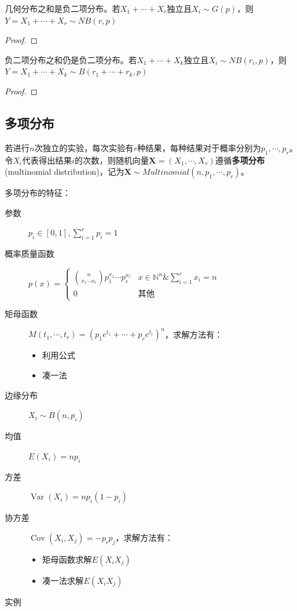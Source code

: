 \begin{proposition}\label{prop:sum_of_geo}
    几何分布之和是负二项分布。若$X_1+\cdots+X_r$独立且$X_i \sim G(p)$，则$Y=X_1+\cdots+X_r  \sim NB(r,p)$
\end{proposition}
\begin{proof}
\end{proof}

\begin{proposition}
    负二项分布之和仍是负二项分布。若$X_1+\cdots+X_k$独立且$X_i \sim NB(r_i,p)$，则$Y=X_1+\cdots+X_k  \sim B(r_1+\cdots+r_k,p )$
\end{proposition}

\begin{proof}
\end{proof}

\subsection{多项分布}

\begin{definition}[多项分布]
    若进行$n$次独立的实验，每次实验有$r$种结果，每种结果对于概率分别为$p_1,\cdots ,p_r$。令$X_i$代表得出结果$i$的次数，则随机向量$\mathbf{X}=(X_1,\cdots ,X_r)$遵循\textbf{多项分布}(multinomial distribution)，记为$\mathbf{X} \sim Multinomial(n,p_1,\cdots ,p_r)$。
\end{definition}

多项分布的特征：
\begin{description}
    \item[参数] $p_i \in [0,1], \sum_{i=1}^r p_i=1$
    \item[概率质量函数] $p(x)=\begin{cases}
                \binom{n}{x_1 \cdots x_r} p_1^{x_1}\cdots p_r^{x_r} & x \in \mathbb{N}^n \& \sum_{i=1}^r x_i=n \\
                0                                                   & \text{其他}
            \end{cases}$
    \item[矩母函数] $M(t_1,\cdots ,t_r)=(p_1 e^{t_1} +\cdots + p_r e^{t_r})^n$，求解方法有：
        \begin{itemize}
            \item 利用公式
            \item 凑一法
        \end{itemize}
    \item[边缘分布] $X_i \sim B(n,p_i)$
    \item[均值] $E(X_i)=np_i$
    \item[方差] $\operatorname{Var}(X_i)=np_i(1-p_i)$
    \item[协方差] $\operatorname{Cov}(X_i,X_j)=-p_i p_j$，求解方法有：
        \begin{itemize}
            \item 矩母函数求解$E(X_i X_j)$
            \item 凑一法求解$E(X_i X_j)$
        \end{itemize}
    \item[实例]
\end{description}

